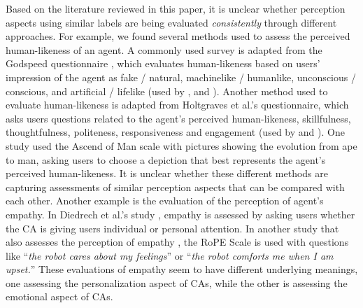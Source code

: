 Based on the literature reviewed in this paper, it is unclear whether perception aspects using similar labels are being evaluated \textit{consistently} through different approaches. For example, we found several methods used to assess the perceived human-likeness of an agent. A commonly used survey is adapted from the Godspeed questionnaire \cite{bartneck2009measurement}, which evaluates human-likeness based on users' impression of the agent as fake / natural, machinelike / humanlike, unconscious / conscious, and artificial / lifelike (used by \cite{hoegen2019end}\cmt{[31]}, \cite{jeong2019exploring}\cmt{[10]} and \cite{ouchi2019should}\cmt{[59]}). Another method used to evaluate human-likeness is adapted from Holtgraves et al.'s \cite{holtgraves2007perceiving} questionnaire, which asks users questions related to the agent's perceived human-likeness, skillfulness, thoughtfulness, politeness, responsiveness and engagement (used by \cite{diederich2019emulating}\cmt{[25]} and  \cite{gnewuch2018faster}\cmt{[19]}). One study \cite{westerman2019believe}\cmt{[9]} used the Ascend of Man scale \cite{kteily2015ascent} with pictures showing the evolution from ape to man, asking users to choose a depiction that best represents the agent's perceived human-likeness. It is unclear whether these different methods are capturing assessments of similar perception aspects that can be compared with each other. Another example is the evaluation of the perception of agent's empathy. In Diedrech et al.'s study \cite{diederich2019emulating}\cmt{[25]}, empathy is assessed by asking users whether the CA is giving users individual or personal attention. In another study that also assesses the perception of empathy \cite{daher2020empathic}\cmt{[58]}, the RoPE Scale \cite{charrier2019rope} is used with questions like ``\textit{the robot cares about my feelings}'' or ``\textit{the robot comforts me when I am upset.}'' These evaluations of empathy seem to have different underlying meanings, one assessing the personalization aspect of CAs, while the other is assessing the emotional aspect of CAs.

